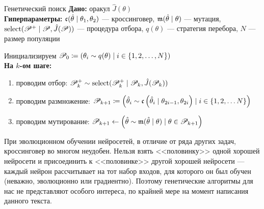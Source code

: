 \begin{algorithm}[label=geneticsearch]{Генетический поиск}
\textbf{Дано:} оракул $\hat{J}(\theta)$ \\
\textbf{Гиперпараметры:} $\mathfrak{c}(\hat{\theta} \mid \theta_1, \theta_2)$ --- кроссинговер, $\mathfrak{m}(\hat{\theta} \mid \theta)$ --- мутация, $\mathrm{select}(\mathscr{P}^+ \mid \mathscr{P}, \hat{J}(\mathscr{P}))$ --- процедура отбора, $q(\theta)$ --- стратегия перебора, $N$ --- размер популяции

\vspace{0.3cm}
Инициализируем $\mathscr{P}_0 \coloneqq \left( \theta_i \sim q(\theta) \mid i \in \{1, 2, \dots , N \} \right)$ \\
\textbf{На $k$-ом шаге:}
\begin{enumerate}
    \item проводим отбор: $\mathscr{P}^{+}_k \sim \mathrm{select}(\mathscr{P}^{+}_k \mid \mathscr{P}_k, \hat{J}(\mathscr{P}_k))$
    \item проводим размножение: $\mathscr{P}_{k+1} \coloneqq \left( \hat{\theta}_i \sim \mathfrak{c} \left( \hat{\theta}_i \mid \theta_{2i - 1}, \theta_{2i} \right) \mid i \in \{1, 2, \dots N\} \right)$
    \item проводим мутирование: $\mathscr{P}_{k+1} \leftarrow \left( \hat{\theta} \sim \mathfrak{m} (\hat{\theta} \mid \theta) \mid \theta \in \mathscr{P}_{k+1} \right)$
\end{enumerate}
\end{algorithm}

\begin{remark}
При эволюционном обучении нейросетей, в отличие от ряда других задач, кроссинговер во многом неудобен. Нельзя взять <<половинку>> одной хорошей нейросети и присоединить к <<половинке>> другой хорошей нейросети --- каждый нейрон рассчитывает на тот набор входов, для которого он был обучен (неважно, эволюционно или градиентно). Поэтому генетические алгоритмы для нас не представляют особого интереса, по крайней мере на момент написания данного текста. 
\end{remark}

